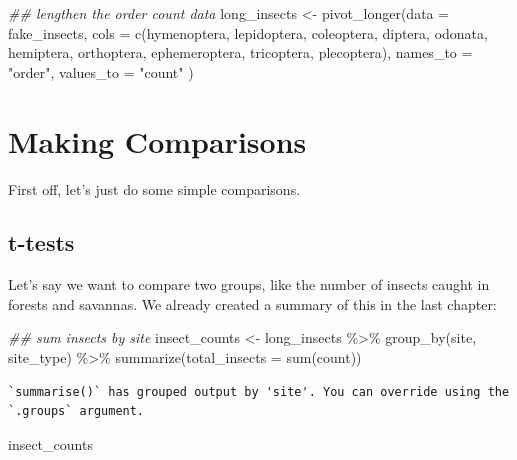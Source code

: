 \documentclass[
  letterpaper,
  DIV=11,
  numbers=noendperiod]{scrreprt}
\newenvironment{Shaded}{\begin{snugshade}}{\end{snugshade}}
\newcommand{\AttributeTok}[1]{\textcolor[rgb]{0.40,0.45,0.13}{#1}}
\newcommand{\DocumentationTok}[1]{\textcolor[rgb]{0.37,0.37,0.37}{\textit{#1}}}
\newcommand{\FunctionTok}[1]{\textcolor[rgb]{0.28,0.35,0.67}{#1}}
\newcommand{\NormalTok}[1]{\textcolor[rgb]{0.00,0.23,0.31}{#1}}
\newcommand{\OtherTok}[1]{\textcolor[rgb]{0.00,0.23,0.31}{#1}}
\newcommand{\SpecialCharTok}[1]{\textcolor[rgb]{0.37,0.37,0.37}{#1}}
\newcommand{\StringTok}[1]{\textcolor[rgb]{0.13,0.47,0.30}{#1}}
\begin{document}
\begin{Shaded}
\begin{Highlighting}[]
\DocumentationTok{\#\# lengthen the order count data}
\NormalTok{long\_insects }\OtherTok{\textless{}{-}} \FunctionTok{pivot\_longer}\NormalTok{(}\AttributeTok{data =}\NormalTok{ fake\_insects, }
                             \AttributeTok{cols =} \FunctionTok{c}\NormalTok{(hymenoptera, lepidoptera, coleoptera, diptera, }
\NormalTok{                                      odonata, hemiptera, orthoptera, ephemeroptera, }
\NormalTok{                                      tricoptera, plecoptera),}
                             \AttributeTok{names\_to =} \StringTok{"order"}\NormalTok{,}
                             \AttributeTok{values\_to =} \StringTok{"count"}
\NormalTok{                             )}
\end{Highlighting}
\end{Shaded}

\section{Making Comparisons}\label{making-comparisons}

First off, let's just do some simple comparisons.

\subsection{t-tests}\label{t-tests}

Let's say we want to compare two groups, like the number of insects
caught in forests and savannas. We already created a summary of this in
the last chapter:

\begin{Shaded}
\begin{Highlighting}[]
\DocumentationTok{\#\# sum insects by site}
\NormalTok{insect\_counts }\OtherTok{\textless{}{-}}\NormalTok{ long\_insects }\SpecialCharTok{\%\textgreater{}\%}
  \FunctionTok{group\_by}\NormalTok{(site, site\_type) }\SpecialCharTok{\%\textgreater{}\%}
  \FunctionTok{summarize}\NormalTok{(}\AttributeTok{total\_insects =} \FunctionTok{sum}\NormalTok{(count))}
\end{Highlighting}
\end{Shaded}

\begin{verbatim}
`summarise()` has grouped output by 'site'. You can override using the
`.groups` argument.
\end{verbatim}

\begin{Shaded}
\begin{Highlighting}[]
\NormalTok{insect\_counts}
\end{Highlighting}
\end{Shaded}
\end{document}
